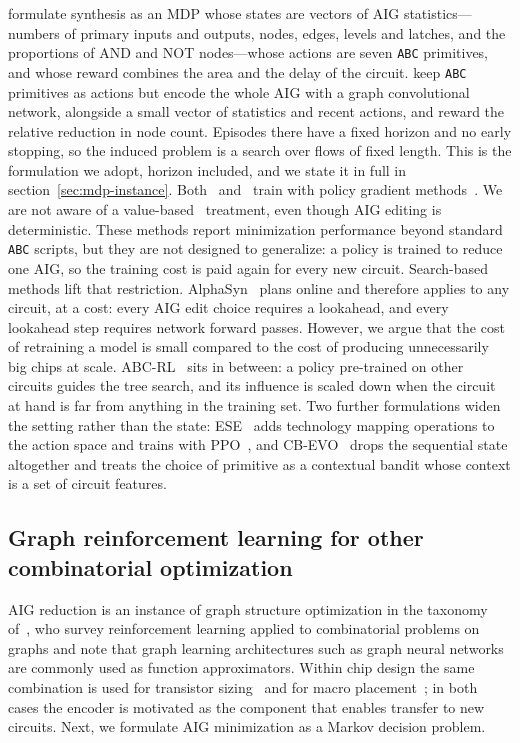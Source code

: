 \documentclass{article}
\begin{document}
\citet{rl-logic1} formulate synthesis as an MDP whose states are vectors of AIG statistics---numbers of primary inputs and outputs, nodes, edges, levels and latches, and the proportions of AND and NOT nodes---whose actions are seven \texttt{ABC} primitives, and whose reward combines the area and the delay of the circuit.
\citet{rl-gnn1} keep \texttt{ABC} primitives as actions but encode the whole AIG with a graph convolutional network, alongside a small vector of statistics and recent actions, and reward the relative reduction in node count.
Episodes there have a fixed horizon and no early stopping, so the induced problem is a search over flows of fixed length.
This is the formulation we adopt, horizon included, and we state it in full in section~\ref{sec:mdp-instance}.
Both~\citet{rl-logic1} and~\citet{rl-gnn1} train with policy gradient methods~\cite{pg_sutton,reinforce,a2c,ppo}.
We are not aware of a value-based~\cite{watkins1992q,dqn} treatment, even though AIG editing is deterministic.
These methods report minimization performance beyond standard \texttt{ABC} scripts, but they are not designed to generalize: a policy is trained to reduce one AIG, so the training cost is paid again for every new circuit.
Search-based methods lift that restriction. AlphaSyn~\cite{gnn-mcts} plans online and therefore applies to any circuit, at a cost: every AIG edit choice requires a lookahead, and every lookahead step requires network forward passes.
However, we argue that the cost of retraining a model is small compared to the cost of producing unnecessarily big chips at scale.
ABC-RL~\cite{more-mcts} sits in between: a policy pre-trained on other circuits guides the tree search, and its influence is scaled down when the circuit at hand is far from anything in the training set.
Two further formulations widen the setting rather than the state: ESE~\cite{more-rl} adds technology mapping operations to the action space and trains with PPO~\cite{ppo}, and CB-EVO~\cite{contextual-bandit} drops the sequential state altogether and treats the choice of primitive as a contextual bandit whose context is a set of circuit features.

\subsection{Graph reinforcement learning for other combinatorial optimization}\label{sec:otherco}
AIG reduction is an instance of graph structure optimization in the taxonomy of~\citet{graphrl}, who survey reinforcement learning applied to combinatorial problems on graphs and note that graph learning architectures such as graph neural networks are commonly used as function approximators.
Within chip design the same combination is used for transistor sizing~\cite{transistors} and for macro placement~\cite{chip}; in both cases the encoder is motivated as the component that enables transfer to new circuits.
Next, we formulate AIG minimization as a Markov decision problem.
\end{document}
